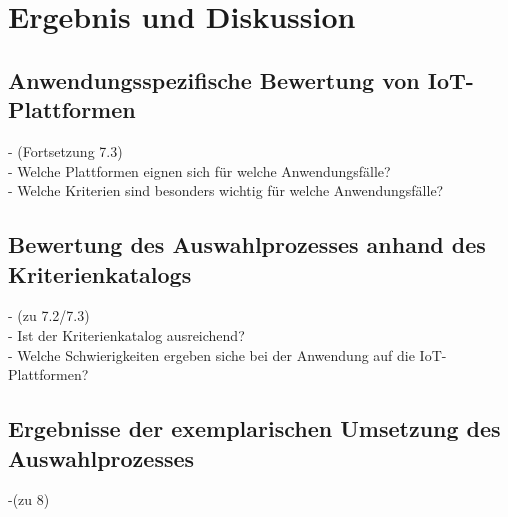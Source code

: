 \chapter{Ergebnis und Diskussion}\label{ch:Ergebnis und Diskussion}
\section{Anwendungsspezifische Bewertung von IoT-Plattformen}\label{sec:Anwendungsspezifische Bewertung von IoT-Plattformen}
- (Fortsetzung 7.3)\\
- Welche Plattformen eignen sich für welche Anwendungsfälle?\\
- Welche Kriterien sind besonders wichtig für welche Anwendungsfälle?\\
\section{Bewertung des Auswahlprozesses anhand des Kriterienkatalogs}\label{sec:Bewertung des Auswahlprozesses anhand des Kriterienkatalogs}
- (zu 7.2/7.3)\\
- Ist der Kriterienkatalog ausreichend?\\
- Welche Schwierigkeiten ergeben siche bei der Anwendung auf die IoT-Plattformen?\\
\section{Ergebnisse der exemplarischen Umsetzung des Auswahlprozesses}\label{sec:Ergebnisse der exemplarischen Umsetzung des Auswahlprozesses}
-(zu 8)\\

